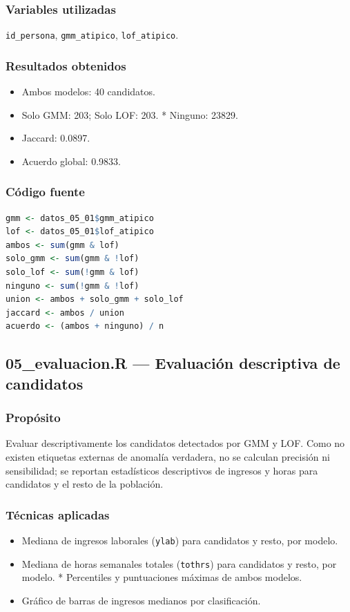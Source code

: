 \documentclass[12pt,a4paper]{article}
\begin{document}
\subsubsection{Variables utilizadas}
\texttt{id\_persona}, \texttt{gmm\_atipico}, \texttt{lof\_atipico}.

\subsubsection{Resultados obtenidos}
\begin{itemize}
  \item Ambos modelos: 40 candidatos.
  \item Solo GMM: 203; Solo LOF: 203.
  * Ninguno: 23829.
  \item Jaccard: 0.0897.
  \item Acuerdo global: 0.9833.
\end{itemize}

\subsubsection{Código fuente}
\begin{lstlisting}[style=Rstyle,language=R]
gmm <- datos_05_01$gmm_atipico
lof <- datos_05_01$lof_atipico
ambos <- sum(gmm & lof)
solo_gmm <- sum(gmm & !lof)
solo_lof <- sum(!gmm & lof)
ninguno <- sum(!gmm & !lof)
union <- ambos + solo_gmm + solo_lof
jaccard <- ambos / union
acuerdo <- (ambos + ninguno) / n
\end{lstlisting}

\subsection{05\_evaluacion.R --- Evaluación descriptiva de candidatos}

\subsubsection{Propósito}
Evaluar descriptivamente los candidatos detectados por GMM y LOF. Como no existen etiquetas externas de anomalía verdadera, no se calculan precisión ni sensibilidad; se reportan estadísticos descriptivos de ingresos y horas para candidatos y el resto de la población.

\subsubsection{Técnicas aplicadas}
\begin{itemize}
  \item Mediana de ingresos laborales (\texttt{ylab}) para candidatos y resto, por modelo.
  \item Mediana de horas semanales totales (\texttt{tothrs}) para candidatos y resto, por modelo.
  * Percentiles y puntuaciones máximas de ambos modelos.
  \item Gráfico de barras de ingresos medianos por clasificación.
\end{itemize}
\end{document}
